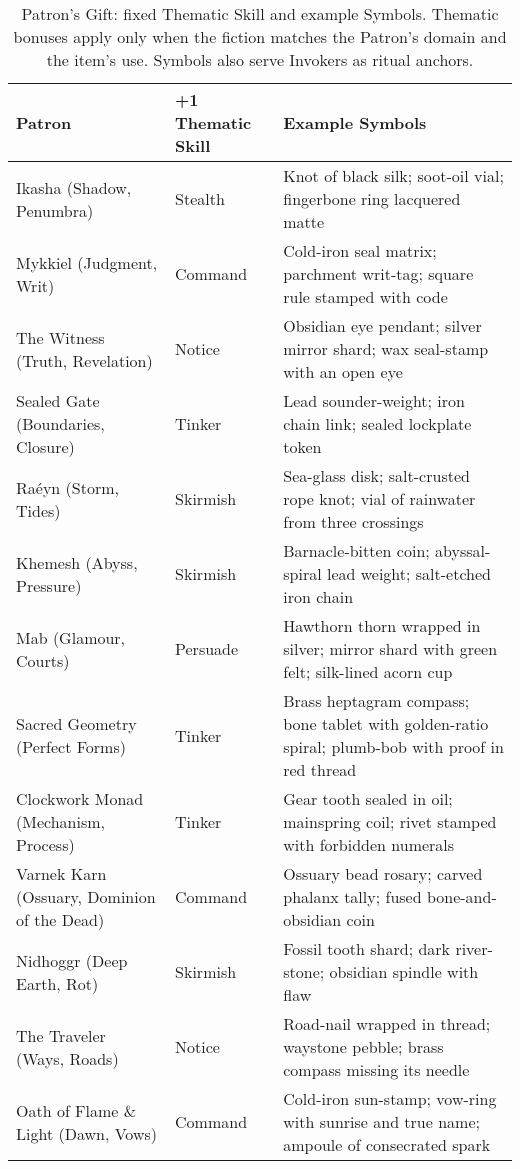 \begin{table}[H]
\centering
\renewcommand{\arraystretch}{1.15}
\begin{tabular}{@{}p{3.8cm}p{3.8cm}p{7.5cm}@{}}
\toprule
\textbf{Patron} & \textbf{+1 Thematic Skill} & \textbf{Example Symbols} \\
\midrule
Ikasha (Shadow, Penumbra) & Stealth & Knot of black silk; soot-oil vial; fingerbone ring lacquered matte \\
Mykkiel (Judgment, Writ) & Command & Cold-iron seal matrix; parchment writ-tag; square rule stamped with code \\
The Witness (Truth, Revelation) & Notice & Obsidian eye pendant; silver mirror shard; wax seal-stamp with an open eye \\
Sealed Gate (Boundaries, Closure) & Tinker & Lead sounder-weight; iron chain link; sealed lockplate token \\
Raéyn (Storm, Tides) & Skirmish & Sea-glass disk; salt-crusted rope knot; vial of rainwater from three crossings \\
Khemesh (Abyss, Pressure) & Skirmish & Barnacle-bitten coin; abyssal-spiral lead weight; salt-etched iron chain \\
Mab (Glamour, Courts) & Persuade & Hawthorn thorn wrapped in silver; mirror shard with green felt; silk-lined acorn cup \\
Sacred Geometry (Perfect Forms) & Tinker & Brass heptagram compass; bone tablet with golden-ratio spiral; plumb-bob with proof in red thread \\
Clockwork Monad (Mechanism, Process) & Tinker & Gear tooth sealed in oil; mainspring coil; rivet stamped with forbidden numerals \\
Varnek Karn (Ossuary, Dominion of the Dead) & Command & Ossuary bead rosary; carved phalanx tally; fused bone-and-obsidian coin \\
Nidhoggr (Deep Earth, Rot) & Skirmish & Fossil tooth shard; dark river-stone; obsidian spindle with flaw \\
The Traveler (Ways, Roads) & Notice & Road-nail wrapped in thread; waystone pebble; brass compass missing its needle \\
Oath of Flame \& Light (Dawn, Vows) & Command & Cold-iron sun-stamp; vow-ring with sunrise and true name; ampoule of consecrated spark \\
\bottomrule
\end{tabular}
\caption{Patron's Gift: fixed Thematic Skill and example Symbols. Thematic bonuses apply only when the fiction matches the Patron’s domain and the item’s use. Symbols also serve Invokers as ritual anchors.}
\label{tab:gift-thematic-map}
\end{table}

